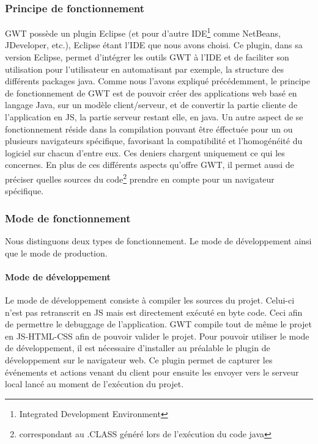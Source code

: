 \subsubsection{Principe de fonctionnement}
GWT possède un plugin Eclipse (et pour d'autre IDE\footnote{Integrated Development Environment} comme NetBeans, JDeveloper, etc.), Eclipse étant l'IDE que nous avons choisi. Ce plugin, dans sa version Eclipse, permet d'intégrer les outils GWT à l'IDE et de faciliter son utilisation pour l'utilisateur en automatisant par exemple, la structure des différents packages java.
\newline
\indent
Comme nous l'avons expliqué précédemment, le principe de fonctionnement de GWT est de pouvoir créer des applications web basé en langage Java, sur un modèle client/serveur, et de convertir la partie cliente de l'application en JS, la partie serveur restant elle, en java. Un autre aspect de se fonctionnement réside dans la compilation pouvant être éffectuée pour un ou plusieurs navigateurs spécifique, favorisant la compatibilité et l'homogénéité du logiciel sur chacun d'entre eux. Ces deniers chargent uniquement ce qui les concernes. En plus de ces différents aspects qu'offre GWT, il permet aussi de préciser quelles sources du code\footnote{correspondant au .CLASS généré lors de l'exécution du code java} prendre en compte pour un navigateur spécifique.

\subsubsection{Mode de fonctionnement}
Nous distinguons deux types de fonctionnement. Le mode de développement ainsi que le mode de production.
	
\paragraph{Mode de développement}
Le mode de développement consiste à compiler les sources du projet. Celui-ci n'est pas retranscrit en JS mais est directement exécuté en byte code. Ceci afin de permettre le debuggage de l'application. GWT compile tout de même le projet en JS-HTML-CSS afin de pouvoir valider le projet.
Pour pouvoir utiliser le mode de développement, il est nécessaire d'installer au préalable le plugin de développement sur le navigateur web. Ce plugin permet de capturer les événements et actions venant du client pour ensuite les envoyer vers le serveur local lancé au moment de l'exécution du projet.
